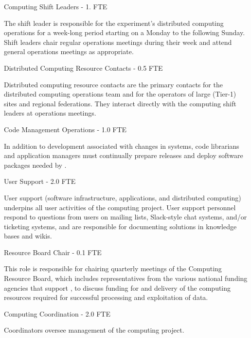 \documentclass[../main-v1.tex]{subfiles}
\begin{document}
\begin{description}
\item {Computing Shift Leaders - 1. FTE}

The shift leader is %
responsible for the experiment's distributed computing operations for a week-long period  %
starting on a Monday to the following Sunday.  Shift leaders chair regular operations meetings during their week and attend general  operations meetings as appropriate. %

\item {Distributed Computing Resource Contacts - 0.5 FTE}

Distributed computing resource contacts are the primary contacts for the  distributed computing operations team and for the operators of large (Tier-1) sites and regional federations. They interact directly with the computing shift leaders at operations meetings. 

\item {Code Management Operations - 1.0 FTE}

In addition to development associated with changes in systems, code librarians and application managers must continually prepare releases and %
deploy  software packages needed by .  

\item {User Support - 2.0 FTE}

User support (software infrastructure, applications, and distributed computing) underpins all user activities of the  computing project. 
User support %
personnel %
respond to questions from users on mailing lists, Slack-style chat systems, and/or ticketing systems, %
and are responsible for documenting solutions in knowledge bases and wikis.

\item {Resource Board Chair - 0.1 FTE}

This role is responsible for chairing quarterly meetings of the Computing Resource Board, which includes representatives from the %
various national funding agencies that support , to discuss %
funding for and delivery of the computing resources required for successful processing and exploitation of  data. %

\item {Computing Coordination - 2.0 FTE}

Coordinators oversee management of the computing project. 
\end{description}
\end{document}
